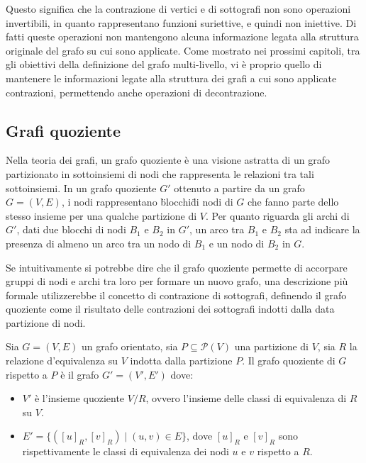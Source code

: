 Questo significa che la contrazione di vertici e di sottografi non sono operazioni invertibili, in quanto
rappresentano funzioni suriettive, e quindi non iniettive.
Di fatti queste operazioni non mantengono alcuna informazione legata alla struttura originale del grafo su cui
sono applicate.
Come mostrato nei prossimi capitoli, tra gli obiettivi della definizione del grafo multi-livello, vi \`e proprio
quello di mantenere le informazioni legate alla struttura dei grafi a cui sono applicate contrazioni, permettendo
anche operazioni di decontrazione.

\subsection{Grafi quoziente}\label{subsec:grafi-quoziente}

Nella teoria dei grafi, un grafo quoziente \`e una visione astratta di un grafo partizionato in sottoinsiemi di nodi
che rappresenta le relazioni tra tali sottoinsiemi.
In un grafo quoziente $G'$ ottenuto a partire da un grafo $G = (V, E)$, i nodi rappresentano \"blocchi\" di nodi di $G$
che fanno parte dello stesso insieme per una qualche partizione di $V$.
Per quanto riguarda gli archi di $G'$, dati due blocchi di nodi $B_1$ e $B_2$ in $G'$, un arco tra $B_1$ e $B_2$ sta
ad indicare la presenza di almeno un arco tra un nodo di $B_1$ e un nodo di $B_2$ in $G$. \newline

Se intuitivamente si potrebbe dire che il grafo quoziente permette di accorpare gruppi di nodi e archi tra loro
per formare un nuovo grafo, una descrizione pi\`u formale utilizzerebbe il concetto di contrazione di sottografi,
definendo il grafo quoziente come il risultato delle contrazioni dei sottografi indotti dalla data partizione di nodi.

\begin{definition}
Sia $G = (V, E)$ un grafo orientato, sia $P \subseteq \mathcal{P}(V)$ una partizione di $V$, sia $R$ la relazione
d'equivalenza su $V$ indotta dalla partizione $P$.
Il grafo quoziente di $G$ rispetto a $P$ \`e il grafo $G' = (V', E')$ dove:
    \begin{itemize}
        \item $V'$ \`e l'insieme quoziente $V/R$, ovvero l'insieme delle classi di equivalenza di $R$ su $V$.
        \item $E' = \{([u]_R, [v]_R) \mid (u, v) \in E\}$, dove $[u]_R$ e $[v]_R$ sono rispettivamente le classi di
        equivalenza dei nodi $u$ e $v$ rispetto a $R$.
    \end{itemize}
\end{definition}

